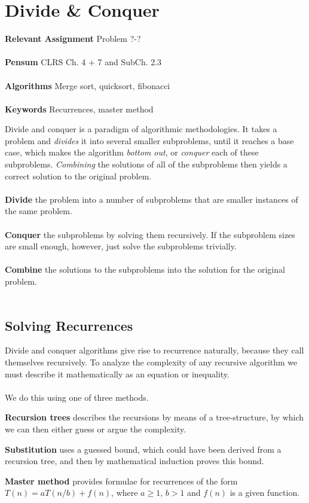 
\chapter{Divide \& Conquer}
\label{ch:divideandconquer}

\textbf{Relevant Assignment} Problem ?-?\\\\
\textbf{Pensum} CLRS Ch. 4 + 7 and SubCh. 2.3\\\\
\textbf{Algorithms} Merge sort, quicksort, fibonacci\\\\
\textbf{Keywords} Recurrences, master method
\vspace{1in}

\noindent Divide and conquer is a paradigm of algorithmic methodologies. It
takes a problem and \textit{divides} it into several smaller subproblems,
until it reaches a base case, which makes the algorithm \textit{bottom out},
or \textit{conquer} each of these subproblems. \textit{Combining} the
solutions of all of the subproblems then yields a correct solution to the
original problem.
\\\\
\noindent \textbf{Divide} the problem into a number of subproblems that are
smaller instances of the same problem.
\\\\
\noindent \textbf{Conquer} the subproblems by solving them recursively. If the
subproblem sizes are small enough, however, just solve the subproblems
trivially.
\\\\
\noindent \textbf{Combine} the solutions to the subproblems into the solution
for the original problem.
\\\\

\section{Solving Recurrences}
Divide and conquer algorithms give rise to recurrence naturally, because they
call themselves recursively. To analyze the complexity of any recursive
algorithm we must describe it mathematically as an equation or inequality.
\\\\
We do this using one of three methods.
\begin{description}
	\item \textbf{Recursion trees} describes the recursions by means of a
tree-structure, by which we can then either guess or argue the complexity.
	\item \textbf{Substitution} uses a guessed bound, which could have been
derived from a recursion tree, and then by mathematical induction proves this
bound.
	\item \textbf{Master method} provides formulae for recurrences of the form
$T(n) = a T(n/b) + f(n)$, where $a \geq 1$, $b > 1$ and $f(n)$ is a given
function.
\end{description}

